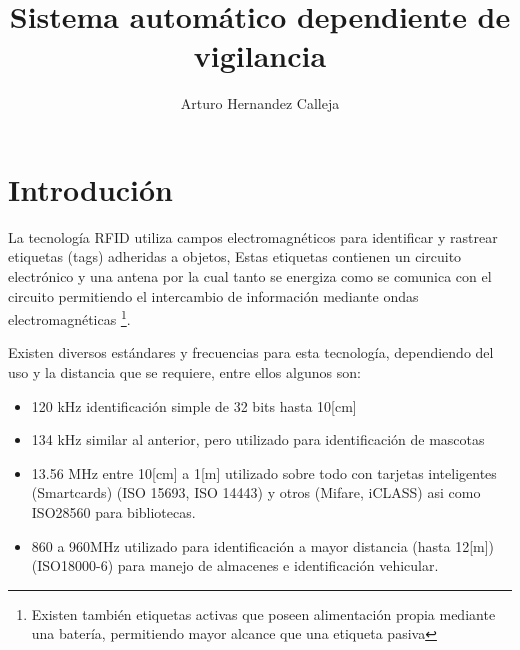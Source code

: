\documentclass[fleqn,10pt]{SelfArx} %
\affiliation{\textsuperscript{1}\textit{Profesional de Investigación, Area de Investigación, Unidad de Innovación Investigación y Desarrollo, AGETIC}} %
\affiliation{*\textbf{Contacto}: ahernandez@agetic.gob.bo} %
\begin{document}
\title{Sistema automático dependiente de vigilancia}

\author{Arturo Hernandez Calleja}


\flushbottom %

\maketitle %

\tableofcontents %

\thispagestyle{empty} %


\section*{Introdución} %

La tecnología RFID utiliza campos electromagnéticos para identificar y rastrear etiquetas (tags) adheridas a objetos, Estas etiquetas  contienen un circuito electrónico y una antena por la cual tanto se energiza como se comunica con el circuito permitiendo el intercambio de información mediante ondas electromagnéticas \footnote{Existen también etiquetas activas que poseen alimentación propia mediante una batería, permitiendo mayor alcance que una etiqueta pasiva}.

Existen diversos estándares y frecuencias para esta tecnología, dependiendo del uso y la distancia que se requiere, entre ellos algunos son:
\begin{itemize}
\item  120 kHz identificación simple de 32 bits hasta 10[cm]
\item  134 kHz similar al anterior, pero utilizado para identificación de mascotas
\item  13.56 MHz entre 10[cm] a 1[m] utilizado sobre todo con tarjetas inteligentes (Smartcards) (ISO 15693, ISO 14443) y otros (Mifare, iCLASS) asi como ISO28560 para bibliotecas.
\item  860 a 960MHz utilizado para identificación a mayor distancia (hasta 12[m]) (ISO18000-6) para manejo de almacenes  e identificación vehicular.
\end{itemize}
\end{document}
